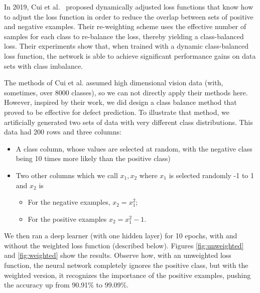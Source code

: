 \documentclass[10pt,compsoc,twocolumn]{IEEEtran}
\newcommand{\bi}{\begin{itemize}}
\newcommand{\ei}{\end{itemize}}
\newcommand{\BLUE}{\color{blue}}
\begin{document}
In 2019, Cui et al.~\cite{Cui_2019_CVPR} proposed dynamically adjusted loss functions that know how to adjust the loss function in order to reduce the overlap between sets of positive and  negative examples.
Their re-weighting scheme   uses the effective number of samples for each class to re-balance the loss, thereby yielding a class-balanced loss. Their experiments show that,
when trained with a dynamic class-balanced loss function, the network is able to achieve significant performance gains on data sets with class imbalance. 

The methods of  Cui et al. assumed high dimensional vision data (with, sometimes, over 8000 classes), so we can  not  directly apply their methods here. However, inspired by their work, we did design a class balance method that proved to be effective for defect prediction.
To illustrate that method, we artificially generated two sets of data with very different class distributions. This data had 200 rows and three columns:
\bi
\item A class column, whose values are selected at random, with the negative class being 10 times more likely than the positive class)

\item
Two other columns which we call $x_1, x_2$
where $x_1$ is selected  randomly -1 to 1
and $x_2$ is
\bi
\item For the negative examples,  $x_2=x_1^2$;
\item For the positive examples $x_2=x_1^2-1$.
\ei
\ei
We then ran a deep learner (with one hidden layer) for 10 epochs, with and without the weighted loss function (described below).
Figures \ref{fig:unweighted} and \ref{fig:weighted} show the results. 
Observe how,
with an unweighted loss function, the neural network completely ignores the positive class, but with the weighted version, it recognizes the importance of the positive examples, pushing the accuracy up from 90.91\% to 99.09\%. 

\BLUE
\end{document}
